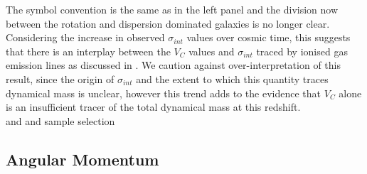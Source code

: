 \documentclass[a4paper,fleqn,usenatbib]{mn2e}
\begin{document}
The symbol convention is the same as in the left panel and the division now between the rotation and dispersion dominated galaxies is no longer clear. 
Considering the increase in observed $\sigma_{int}$ values over cosmic time, this suggests that there is an interplay between the $V_{C}$ values and $\sigma_{int}$ traced by ionised gas emission lines as discussed in \cite{Kassin2012}. 
We caution against over-interpretation of this result, since the origin of $\sigma_{int}$ and the extent to which this quantity traces dynamical mass is unclear, however this trend adds to the evidence that $V_{C}$ alone is an insufficient tracer of the total dynamical mass at this redshift. \\
\cite{Straatman2017} and \cite{Ubler2017} and sample selection



\subsection{Angular Momentum}\label{subsec:ang_mom}
\end{document}
